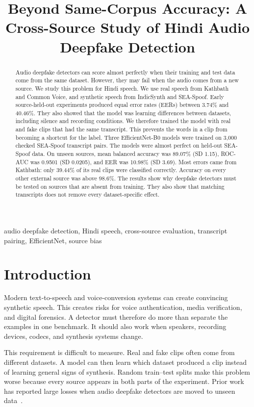 \documentclass[conference]{IEEEtran}
\title{Beyond Same-Corpus Accuracy: A Cross-Source Study of Hindi Audio Deepfake Detection}
\author{
\IEEEauthorblockN{Prathmesh Pravin Sanap, Shivam Vinod Shewale, Yash Vinayak Jadhav, Snehal Sandeep Sanap}
\IEEEauthorblockA{Department of Computer Engineering\\
K. K. Wagh Institute of Engineering Education and Research, Nashik, India\\
Under the guidance of Prof. S. S. Bhandare}
}
\begin{document}
\maketitle

\begin{abstract}
Audio deepfake detectors can score almost perfectly when their training and
test data come from the same dataset. However, they may fail when the audio
comes from a new source. We study this problem for Hindi speech. We use real
speech from Kathbath and Common Voice, and synthetic speech from IndicSynth
and SEA-Spoof. Early source-held-out experiments produced equal error rates
(EERs) between 3.74\% and 40.46\%. They also showed that the model was
learning differences between datasets, including silence and recording
conditions. We therefore trained the model with real and fake clips that had
the same transcript. This prevents the words in a clip from becoming a
shortcut for the label. Three EfficientNet-B0 models were trained on 3,000
checked SEA-Spoof transcript pairs. The models were almost perfect on
held-out SEA-Spoof data. On unseen sources, mean balanced accuracy was
89.07\% (SD 1.15), ROC-AUC was 0.9501 (SD 0.0205), and EER was 10.98\%
(SD 3.69). Most errors came from Kathbath: only 39.44\% of its real clips
were classified correctly. Accuracy on every other external source was above
98.6\%. The results show why deepfake detectors must be tested on sources
that are absent from training. They also show that matching transcripts does
not remove every dataset-specific effect.
\end{abstract}

\begin{IEEEkeywords}
audio deepfake detection, Hindi speech, cross-source evaluation,
transcript pairing, EfficientNet, source bias
\end{IEEEkeywords}

\section{Introduction}
Modern text-to-speech and voice-conversion systems can create convincing
synthetic speech. This creates risks for voice authentication, media
verification, and digital forensics. A detector must therefore do more than
separate the examples in one benchmark. It should also work when speakers,
recording devices, codecs, and synthesis systems change.

This requirement is difficult to measure. Real and fake clips often come
from different datasets. A model can then learn which dataset produced a
clip instead of learning general signs of synthesis. Random train--test
splits make this problem worse because every source appears in both parts of
the experiment. Prior work has reported large losses when audio deepfake
detectors are moved to unseen data~\cite{muller2022generalize,muller2024harder}.
\end{document}
